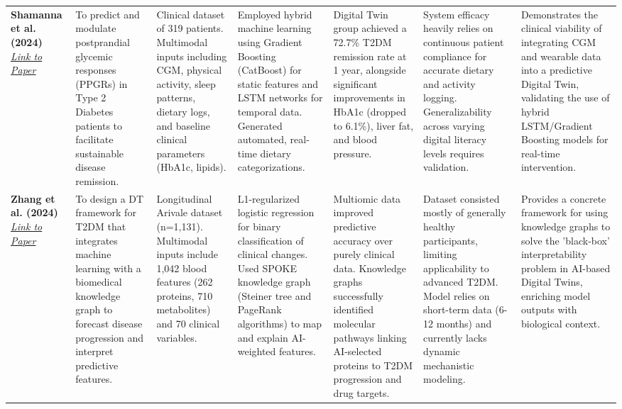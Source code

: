 \documentclass[12pt]{article}
\begin{document}
{\begin{xltabular}{\textwidth}{@{} >{\hsize}L *{6}{>{\hsize}L} @{}}
    \textbf{Shamanna et al. (2024)}~\cite{shamanna2024personalized} \newline \href{https://www.scopus.com/pages/publications/85211190268?origin=resultslist}{\textcolor{linkblue}{\textit{Link to Paper}}} &
    To predict and modulate postprandial glycemic responses (PPGRs) in Type 2 Diabetes patients to facilitate sustainable disease remission. &
    Clinical dataset of 319 patients. Multimodal inputs including CGM, physical activity, sleep patterns, dietary logs, and baseline clinical parameters (HbA1c, lipids). &
    Employed hybrid machine learning using Gradient Boosting (CatBoost) for static features and LSTM networks for temporal data. Generated automated, real-time dietary categorizations. &
    Digital Twin group achieved a 72.7\% T2DM remission rate at 1 year, alongside significant improvements in HbA1c (dropped to 6.1\%), liver fat, and blood pressure. &
    System efficacy heavily relies on continuous patient compliance for accurate dietary and activity logging. Generalizability across varying digital literacy levels requires validation. &
    Demonstrates the clinical viability of integrating CGM and wearable data into a predictive Digital Twin, validating the use of hybrid LSTM/Gradient Boosting models for real-time intervention. \\

    \textbf{Zhang et al. (2024)}~\cite{zhang2024framework} \newline \href{https://www.researchgate.net/publication/378155858_A_framework_towards_digital_twins_for_type_2_diabetes}{\textcolor{linkblue}{\textit{Link to Paper}}} &
    To design a DT framework for T2DM that integrates machine learning with a biomedical knowledge graph to forecast disease progression and interpret predictive features. &
    Longitudinal Arivale dataset (n=1,131). Multimodal inputs include 1,042 blood features (262 proteins, 710 metabolites) and 70 clinical variables. &
    L1-regularized logistic regression for binary classification of clinical changes. Used SPOKE knowledge graph (Steiner tree and PageRank algorithms) to map and explain AI-weighted features. &
    Multiomic data improved predictive accuracy over purely clinical data. Knowledge graphs successfully identified molecular pathways linking AI-selected proteins to T2DM progression and drug targets. &
    Dataset consisted mostly of generally healthy participants, limiting applicability to advanced T2DM. Model relies on short-term data (6-12 months) and currently lacks dynamic mechanistic modeling. &
    Provides a concrete framework for using knowledge graphs to solve the 'black-box' interpretability problem in AI-based Digital Twins, enriching model outputs with biological context. \\

\end{xltabular}
}
\end{document}
